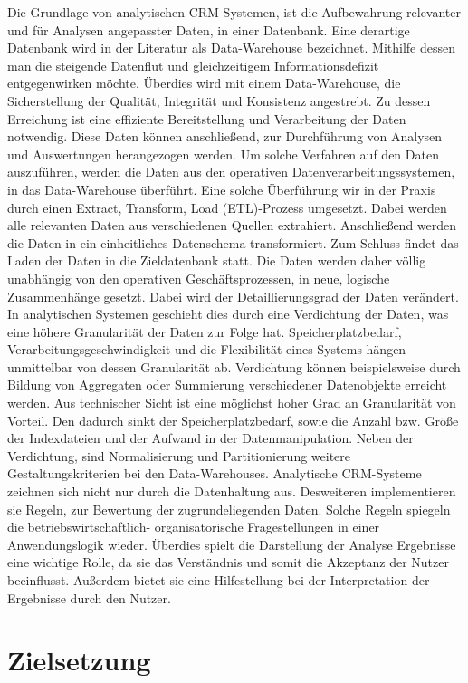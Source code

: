 Die Grundlage von analytischen CRM-Systemen, ist die Aufbewahrung relevanter und für Analysen angepasster Daten, in einer Datenbank. Eine derartige Datenbank wird in der Literatur als Data-Warehouse bezeichnet. Mithilfe dessen man die steigende Datenflut und gleichzeitigem Informationsdefizit entgegenwirken möchte. Überdies wird mit einem Data-Warehouse, die Sicherstellung der Qualität, Integrität und Konsistenz angestrebt. Zu dessen Erreichung ist eine effiziente Bereitstellung und Verarbeitung der Daten notwendig. Diese Daten können anschließend, zur Durchführung von Analysen und Auswertungen herangezogen werden. Um solche Verfahren auf den Daten auszuführen, werden die Daten aus den operativen Datenverarbeitungssystemen, in das Data-Warehouse überführt. Eine solche Überführung wir in der Praxis durch einen Extract, Transform, Load (ETL)-Prozess umgesetzt. Dabei werden alle relevanten Daten aus verschiedenen Quellen extrahiert. Anschließend werden die Daten in ein einheitliches Datenschema transformiert. Zum Schluss findet das Laden der Daten in die Zieldatenbank statt. 
Die Daten werden daher völlig unabhängig von den operativen Geschäftsprozessen, in neue, logische Zusammenhänge gesetzt. Dabei wird der Detaillierungsgrad der Daten verändert. In analytischen Systemen geschieht dies durch eine Verdichtung der Daten, was eine höhere Granularität der Daten zur Folge hat. Speicherplatzbedarf,  Verarbeitungsgeschwindigkeit und die Flexibilität eines Systems hängen unmittelbar von dessen Granularität ab. Verdichtung können beispielsweise durch Bildung von Aggregaten oder Summierung verschiedener Datenobjekte erreicht werden. Aus technischer Sicht ist eine möglichst hoher Grad an Granularität von Vorteil. Den dadurch sinkt der Speicherplatzbedarf, sowie die Anzahl bzw. Größe der Indexdateien und der Aufwand in der Datenmanipulation. Neben der Verdichtung, sind Normalisierung und Partitionierung weitere Gestaltungskriterien bei den Data-Warehouses. Analytische CRM-Systeme zeichnen sich nicht nur durch die Datenhaltung aus. Desweiteren implementieren sie Regeln, zur Bewertung der zugrundeliegenden Daten. Solche Regeln spiegeln die betriebswirtschaftlich-
organisatorische Fragestellungen in einer Anwendungslogik wieder. Überdies spielt die Darstellung der Analyse Ergebnisse eine wichtige Rolle, da sie das Verständnis und somit die Akzeptanz der Nutzer beeinflusst. Außerdem bietet sie eine Hilfestellung bei der Interpretation der Ergebnisse durch den Nutzer.

\section{Zielsetzung}
\label{ch:Einfuehrung:sec:Zielsetzung}

